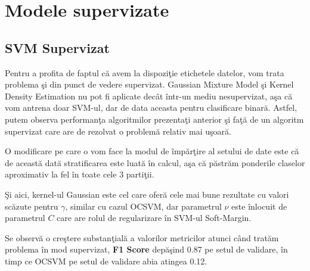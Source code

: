 \section{Modele supervizate}

\subsection{SVM Supervizat}

Pentru a profita de faptul că avem la dispoziţie etichetele datelor, vom trata 
problema şi din punct de vedere supervizat. Gaussian Mixture Model şi Kernel 
Density Estimation nu pot fi aplicate decât într-un mediu nesupervizat, aşa 
că vom antrena doar SVM-ul, dar de data aceasta pentru clasificare binară.
Astfel, putem observa performanţa algoritmilor prezentaţi anterior şi faţă 
de un algoritm supervizat care are de rezolvat o problemă relativ mai uşoară.

O modificare pe care o vom face la modul de împărţire al setului de date 
este că de această dată stratificarea este luată în calcul, aşa că păstrăm 
ponderile claselor aproximativ la fel în toate cele 3 partiţii.

Şi aici, kernel-ul Gaussian este cel care oferă cele mai bune rezultate cu 
valori scăzute pentru $\gamma$, similar cu cazul OCSVM, dar parametrul 
$\nu$ este înlocuit
de parametrul $C$ care are rolul de regularizare în SVM-ul Soft-Margin.

Se observă o creştere substanţială a valorilor metricilor atunci când tratăm 
problema în mod supervizat, \textbf{F1 Score} 
depăşind 0.87 pe setul de validare, în timp ce 
OCSVM pe setul de validare abia atingea 0.12.

